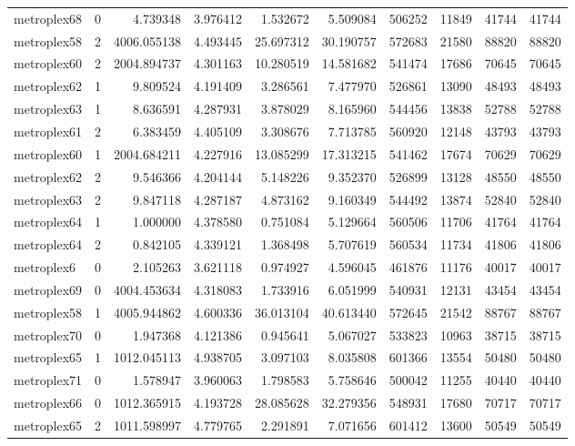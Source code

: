 \documentclass[../../../thesis.tex]{subfiles}
\begin{document}
\begin{longtable}{|l|r|r|r|r|r|r|r|r|r|}
metroplex68 & 0 & 4.739348 & 3.976412 & 1.532672 & 5.509084 & 506252 & 11849 & 41744 & 41744 \\
metroplex58 & 2 & 4006.055138 & 4.493445 & 25.697312 & 30.190757 & 572683 & 21580 & 88820 & 88820 \\
metroplex60 & 2 & 2004.894737 & 4.301163 & 10.280519 & 14.581682 & 541474 & 17686 & 70645 & 70645 \\
metroplex62 & 1 & 9.809524 & 4.191409 & 3.286561 & 7.477970 & 526861 & 13090 & 48493 & 48493 \\
metroplex63 & 1 & 8.636591 & 4.287931 & 3.878029 & 8.165960 & 544456 & 13838 & 52788 & 52788 \\
metroplex61 & 2 & 6.383459 & 4.405109 & 3.308676 & 7.713785 & 560920 & 12148 & 43793 & 43793 \\
metroplex60 & 1 & 2004.684211 & 4.227916 & 13.085299 & 17.313215 & 541462 & 17674 & 70629 & 70629 \\
metroplex62 & 2 & 9.546366 & 4.204144 & 5.148226 & 9.352370 & 526899 & 13128 & 48550 & 48550 \\
metroplex63 & 2 & 9.847118 & 4.287187 & 4.873162 & 9.160349 & 544492 & 13874 & 52840 & 52840 \\
metroplex64 & 1 & 1.000000 & 4.378580 & 0.751084 & 5.129664 & 560506 & 11706 & 41764 & 41764 \\
metroplex64 & 2 & 0.842105 & 4.339121 & 1.368498 & 5.707619 & 560534 & 11734 & 41806 & 41806 \\
metroplex6 & 0 & 2.105263 & 3.621118 & 0.974927 & 4.596045 & 461876 & 11176 & 40017 & 40017 \\
metroplex69 & 0 & 4004.453634 & 4.318083 & 1.733916 & 6.051999 & 540931 & 12131 & 43454 & 43454 \\
metroplex58 & 1 & 4005.944862 & 4.600336 & 36.013104 & 40.613440 & 572645 & 21542 & 88767 & 88767 \\
metroplex70 & 0 & 1.947368 & 4.121386 & 0.945641 & 5.067027 & 533823 & 10963 & 38715 & 38715 \\
metroplex65 & 1 & 1012.045113 & 4.938705 & 3.097103 & 8.035808 & 601366 & 13554 & 50480 & 50480 \\
metroplex71 & 0 & 1.578947 & 3.960063 & 1.798583 & 5.758646 & 500042 & 11255 & 40440 & 40440 \\
metroplex66 & 0 & 1012.365915 & 4.193728 & 28.085628 & 32.279356 & 548931 & 17680 & 70717 & 70717 \\
metroplex65 & 2 & 1011.598997 & 4.779765 & 2.291891 & 7.071656 & 601412 & 13600 & 50549 & 50549 \\

\end{longtable}
\end{document}
